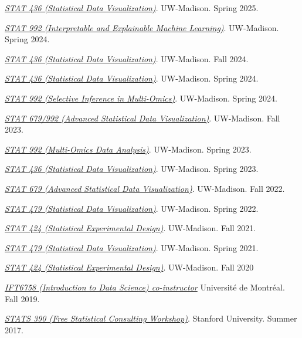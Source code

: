 \documentclass[letterpaper]{article}
\renewenvironment{itemize}{
  \begin{list}{}{
    \setlength{\leftmargin}{1.5em}
  }
}{
  \end{list}
}
\begin{document}
\begin{itemize}
\item \textit{\href{https://krisrs1128.github.io/stat436_s25/}{STAT 436 (Statistical Data Visualization)}}. UW-Madison. Spring 2025.
\item \textit{\href{https://github.com/krisrs1128/stat992_s25}{STAT 992 (Interpretable and Explainable Machine Learning)}}. UW-Madison. Spring 2024.
\item \textit{\href{https://krisrs1128.github.io/stat436_f24/}{STAT 436 (Statistical Data Visualization)}}. UW-Madison. Fall 2024.
\item \textit{\href{https://krisrs1128.github.io/stat436_s24/}{STAT 436 (Statistical Data Visualization)}}.  UW-Madison. Spring 2024.
\item \textit{\href{https://github.com/krisrs1128/stat992_s24}{STAT 992 (Selective Inference in Multi-Omics)}}. UW-Madison. Spring 2024.
\item \textit{\href{https://krisrs1128.github.io/stat992_f23/}{STAT 679/992 (Advanced Statistical Data Visualization)}}.
UW-Madison. Fall 2023.
\item \textit{\href{https://krisrs1128.github.io/stat992_s23/}{STAT 992 (Multi-Omics Data Analysis)}}. 
UW-Madison. Spring 2023.
\item \textit{\href{https://krisrs1128.github.io/stat436_s23/}{STAT 436 (Statistical Data Visualization)}}.
UW-Madison. Spring 2023.
\item \textit{\href{https://krisrs1128.github.io/stat679_notes/}{STAT 679 (Advanced Statistical Data Visualization)}}.
UW-Madison. Fall 2022.
\item \textit{\href{https://github.com/krisrs1128/stat479_s22}{STAT 479 (Statistical Data Visualization)}}.
UW-Madison. Spring 2022.
\item \textit{\href{https://krisrs1128.github.io/stat424_f21}{STAT 424 (Statistical Experimental Design)}}.
UW-Madison. Fall 2021.
\item \textit{\href{https://krisrs1128/github.io/stat479/}{STAT 479 (Statistical Data Visualization)}}.
UW-Madison. Spring 2021.
\item \textit{\href{https://mediaspace.wisc.edu/channel/STAT424Fall2020/180027062}{STAT
424 (Statistical Experimental Design)}}. UW-Madison. Fall
2020
\item \textit{\href{https://ift6758.github.io/}{IFT6758 (Introduction to Data Science) co-instructor}}
Universit\'e de Montr\'eal. Fall 2019.
\item \href{https://www.overleaf.com/10240923zrkwyvndkwnn#/37916755/}{\textit{STATS 390 (Free Statistical Consulting Workshop)}}.
  Stanford University. Summer 2017.
\end{itemize}
\end{document}

